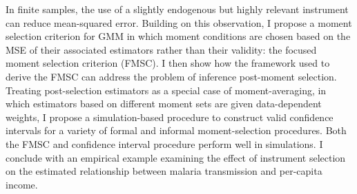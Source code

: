 In finite samples, the use of a slightly endogenous but highly relevant instrument can reduce mean-squared error. Building on this observation, I propose a moment selection criterion for GMM in which moment conditions are chosen based on the MSE of their associated estimators rather than their validity: the focused moment selection criterion (FMSC). 
I then show how the framework used to derive the FMSC can address the problem of inference post-moment selection.
Treating post-selection estimators as a special case of moment-averaging, in which estimators based on different moment sets are given data-dependent weights, I propose a simulation-based procedure to construct valid confidence intervals for a variety of formal and informal moment-selection procedures.
Both the FMSC and confidence interval procedure perform well in simulations.
I conclude with an empirical example examining the effect of instrument selection on the estimated relationship between malaria transmission and per-capita income.